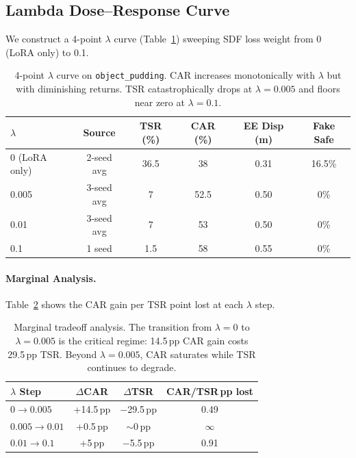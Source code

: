 \documentclass[10pt,twocolumn]{article}
\begin{document}
\subsection{Lambda Dose--Response Curve}
\label{sec:lambda}

We construct a 4-point $\lambda$ curve (Table~\ref{tab:lambda}) sweeping SDF loss weight from 0 (LoRA only) to 0.1.

\begin{table}[h]
\centering
\caption{4-point $\lambda$ curve on \texttt{object\_pudding}. CAR increases monotonically with $\lambda$ but with diminishing returns. TSR catastrophically drops at $\lambda=0.005$ and floors near zero at $\lambda=0.1$.}
\label{tab:lambda}
\small
\begin{tabular}{lccccc}
\toprule
$\lambda$ & Source & TSR (\%) & CAR (\%) & EE Disp (m) & Fake Safe \\
\midrule
0 (LoRA only) & 2-seed avg & 36.5 & 38 & 0.31 & 16.5\% \\
0.005 & 3-seed avg & 7 & 52.5 & 0.50 & 0\% \\
0.01 & 3-seed avg & 7 & 53 & 0.50 & 0\% \\
0.1 & 1 seed & 1.5 & 58 & 0.55 & 0\% \\
\bottomrule
\end{tabular}
\end{table}

\paragraph{Marginal Analysis.}
Table~\ref{tab:marginal} shows the CAR gain per TSR point lost at each $\lambda$ step.

\begin{table}[h]
\centering
\caption{Marginal tradeoff analysis. The transition from $\lambda=0$ to $\lambda=0.005$ is the critical regime: 14.5\,pp CAR gain costs 29.5\,pp TSR. Beyond $\lambda=0.005$, CAR saturates while TSR continues to degrade.}
\label{tab:marginal}
\small
\begin{tabular}{lccc}
\toprule
$\lambda$ Step & $\Delta$CAR & $\Delta$TSR & CAR/TSR\,pp lost \\
\midrule
$0 \to 0.005$ & +14.5\,pp & $-$29.5\,pp & 0.49 \\
$0.005 \to 0.01$ & +0.5\,pp & $\sim$0\,pp & $\infty$ \\
$0.01 \to 0.1$ & +5\,pp & $-$5.5\,pp & 0.91 \\
\bottomrule
\end{tabular}
\end{table}
\end{document}
